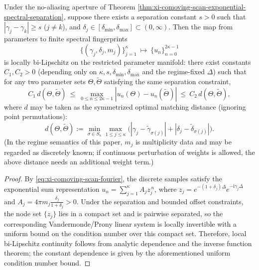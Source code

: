\begin{theorem}[Minimum separation \texorpdfstring{$\Rightarrow$}{=>} inversion stability: tomographic inversion is locally bi-Lipschitz under geometric spacing constraints]\label{thm:xi-scan-min-separation-local-bilipschitz}
Under the no-aliasing aperture of Theorem \ref{thm:xi-comoving-scan-exponential-spectral-separation},
suppose there exists a separation constant \(s>0\) such that \(|\gamma_j-\gamma_k|\ge s\) (\(j\ne k\)), and \(\delta_j\in[\delta_{\min},\delta_{\max}]\subset(0,\infty)\).
Then the map from parameters to finite spectral fingerprints
\[
\{(\gamma_j,\delta_j,m_j)\}_{j=1}^{\kappa}\ \longmapsto\ \{u_n\}_{n=0}^{2\kappa-1}
\]
is locally bi-Lipschitz on the restricted parameter manifold: there exist constants \(C_1,C_2>0\) (depending only on \(\kappa,s,\delta_{\min},\delta_{\max}\) and the regime-fixed \(\Delta\)) such that for any two parameter sets \(\Theta,\widetilde\Theta\) satisfying the same separation constraint,
\[
C_1\,d(\Theta,\widetilde\Theta)
\ \le\
\max_{0\le n\le 2\kappa-1}|u_n(\Theta)-u_n(\widetilde\Theta)|
\ \le\
C_2\,d(\Theta,\widetilde\Theta),
\]
where \(d\) may be taken as the symmetrized optimal matching distance (ignoring point permutations):
\[
d(\Theta,\widetilde\Theta)
:=
\min_{\sigma\in S_\kappa}\max_{1\le j\le \kappa}\bigl(|\gamma_j-\widetilde\gamma_{\sigma(j)}|+|\delta_j-\widetilde\delta_{\sigma(j)}|\bigr).
\]
(In the regime semantics of this paper, \(m_j\) is multiplicity data and may be regarded as discretely known; if continuous perturbation of weights is allowed, the above distance needs an additional weight term.)
\end{theorem}

\begin{proof}
By \eqref{eq:xi-comoving-scan-fourier}, the discrete samples satisfy the exponential sum representation \(u_n=\sum_{j=1}^{\kappa}A_j z_j^{\,n}\), where
\(
z_j=e^{-(1+\delta_j)\Delta}e^{-\mathrm{i}\gamma_j\Delta}
\)
and
\(
A_j=4\pi m_j\frac{\delta_j}{1+\delta_j}>0
\).
Under the separation and bounded offset constraints, the node set \(\{z_j\}\) lies in a compact set and is pairwise separated, so the corresponding Vandermonde/Prony linear system is locally invertible with a uniform bound on the condition number over this compact set.
Therefore, local bi-Lipschitz continuity follows from analytic dependence and the inverse function theorem; the constant dependence is given by the aforementioned uniform condition number bound. \qedhere
\end{proof}

